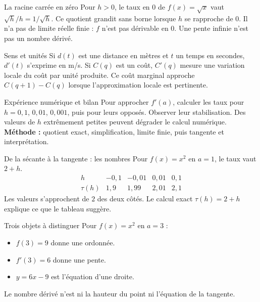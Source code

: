 \documentclass[aspectratio=169,12pt]{beamer}
\begin{document}
\renewcommand{\slidekind}{COMPRENDRE}
\begin{frame}[t,fragile]{La racine carrée en zéro}
Pour $h>0$, le taux en $0$ de $f(x)=\sqrt{x}$ vaut $\sqrt h/h=1/\sqrt h$. Ce quotient grandit sans borne lorsque $h$ se rapproche de $0$. Il n’a pas de limite réelle finie : $f$ n’est pas dérivable en $0$. Une pente infinie n’est pas un nombre dérivé.
\end{frame}
\renewcommand{\slidekind}{COMPRENDRE}
\begin{frame}[t,fragile]{Sens et unités}
Si $d(t)$ est une distance en mètres et $t$ un temps en secondes, $d\prime(t)$ s’exprime en m/s. Si $C(q)$ est un coût, $C\prime(q)$ mesure une variation locale du coût par unité produite. Ce coût marginal approche $C(q+1)-C(q)$ lorsque l’approximation locale est pertinente.
\end{frame}
\renewcommand{\slidekind}{À RETENIR}
\begin{frame}[t,fragile]{Expérience numérique et bilan}
Pour approcher $f\prime(a)$, calculer les taux pour $h=0,1$, $0,01$, $0,001$, puis pour leurs opposés. Observer leur stabilisation. Des valeurs de $h$ extrêmement petites peuvent dégrader le calcul numérique. \textbf{Méthode :} quotient exact, simplification, limite finie, puis tangente et interprétation.
\end{frame}
\renewcommand{\slidekind}{COMPRENDRE}
\begin{frame}[t,fragile]{De la sécante à la tangente : les nombres}
Pour $f(x)=x^2$ en $a=1$, le taux vaut $2+h$.\[\begin{array}{c|rrrr}h&-0,1&-0,01&0,01&0,1\\\hline\tau(h)&1,9&1,99&2,01&2,1\end{array}\]\medskip Les valeurs s’approchent de $2$ des deux côtés. Le calcul exact $\tau(h)=2+h$ explique ce que le tableau suggère.
\end{frame}
\renewcommand{\slidekind}{COMPRENDRE}
\begin{frame}[t,fragile]{Trois objets à distinguer}
Pour $f(x)=x^2$ en $a=3$ :\begin{itemize}\item $f(3)=9$ donne une ordonnée.\item $f\prime(3)=6$ donne une pente.\item $y=6x-9$ est l’équation d’une droite.\end{itemize} Le nombre dérivé n’est ni la hauteur du point ni l’équation de la tangente.
\end{frame}
\renewcommand{\slidekind}{À RETENIR}
\end{document}
